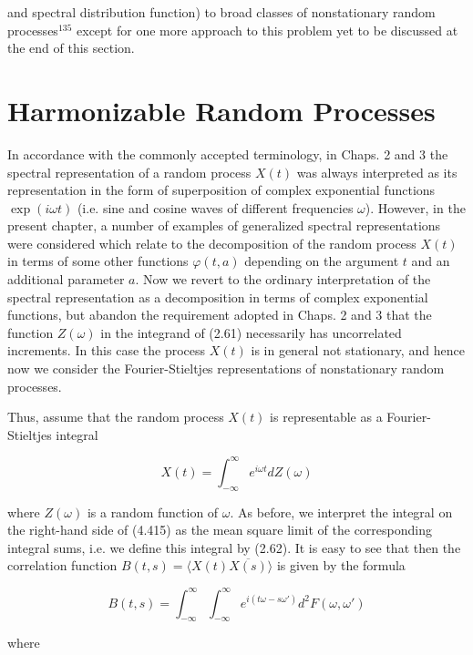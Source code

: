 \documentclass{article}
\begin{document}
\newpage

and spectral distribution function) to broad classes of nonstationary random processes$^{135}$ except for one more approach to this problem yet to be discussed at the end of this section.

\section{Harmonizable Random Processes}

In accordance with the commonly accepted terminology, in Chaps. 2 and 3 the spectral representation of a random process $X(t)$ was always interpreted as its representation in the form of superposition of complex exponential functions $\exp(i\omega t)$ (i.e. sine and cosine waves of different frequencies $\omega$). However, in the present chapter, a number of examples of generalized spectral representations were considered which relate to the decomposition of the random process $X(t)$ in terms of some other functions $\varphi(t,a)$ depending on the argument $t$ and an additional parameter $a$. Now we revert to the ordinary interpretation of the spectral representation as a decomposition in terms of complex exponential functions, but abandon the requirement adopted in Chaps. 2 and 3 that the function $Z(\omega)$ in the integrand of (2.61) necessarily has uncorrelated increments. In this case the process $X(t)$ is in general not stationary, and hence now we consider the Fourier-Stieltjes representations of nonstationary random processes.

Thus, assume that the random process $X(t)$ is representable as a Fourier-Stieltjes integral

\begin{equation}
X(t) = \int_{-\infty}^{\infty} e^{i\omega t}dZ(\omega)
\end{equation}

where $Z(\omega)$ is a random function of $\omega$. As before, we interpret the integral on the right-hand side of (4.415) as the mean square limit of the corresponding integral sums, i.e. we define this integral by (2.62). It is easy to see that then the correlation function $B(t,s) = \langle X(t)\overline{X(s)} \rangle$ is given by the formula

\begin{equation}
B(t,s) = \int_{-\infty}^{\infty} \int_{-\infty}^{\infty} e^{i(t\omega-s\omega')}d^2F(\omega,\omega')
\end{equation}

where
\end{document}
